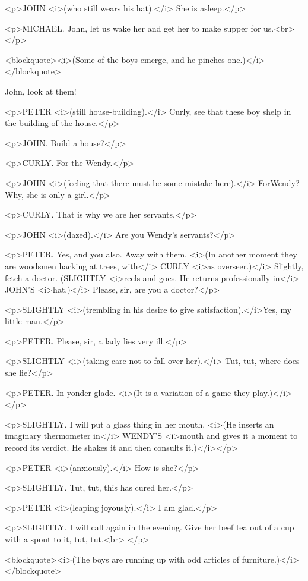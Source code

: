<p>JOHN <i>(who still wears his hat).</i> She is asleep.</p>

<p>MICHAEL. John, let us wake her and get her to make supper for
us.<br>
</p>

<blockquote><i>(Some of the boys emerge, and he pinches
one.)</i></blockquote>

John, look at them! 

<p>PETER <i>(still house-building).</i> Curly, see that these boy
shelp in the building of the house.</p>

<p>JOHN. Build a house?</p>

<p>CURLY. For the Wendy.</p>

<p>JOHN <i>(feeling that there must be some mistake here).</i>
ForWendy? Why, she is only a girl.</p>

<p>CURLY. That is why we are her servants.</p>

<p>JOHN <i>(dazed).</i> Are you Wendy's servants?</p>

<p>PETER. Yes, and you also. Away with them. <i>(In another moment
they are woodsmen hacking at trees, with</i> CURLY <i>as
overseer.)</i> Slightly, fetch a doctor. (SLIGHTLY <i>reels and goes.
He returns professionally in</i> JOHN'S <i>hat.)</i> Please, sir, are
you a doctor?</p>

<p>SLIGHTLY <i>(trembling in his desire to give
satisfaction).</i>Yes, my little man.</p>

<p>PETER. Please, sir, a lady lies very ill.</p>

<p>SLIGHTLY <i>(taking care not to fall over her).</i> Tut, tut,
where does she lie?</p>

<p>PETER. In yonder glade. <i>(It is a variation of a game they
play.)</i></p>

<p>SLIGHTLY. I will put a glass thing in her mouth. <i>(He inserts an
imaginary thermometer in</i> WENDY'S <i>mouth and gives it a moment
to record its verdict. He shakes it and then consults it.)</i></p>

<p>PETER <i>(anxiously).</i> How is she?</p>

<p>SLIGHTLY. Tut, tut, this has cured her.</p>

<p>PETER <i>(leaping joyously).</i> I am glad.</p>

<p>SLIGHTLY. I will call again in the evening. Give her beef tea out
of a cup with a spout to it, tut, tut.<br>
</p>

<blockquote><i>(The boys are running up with odd articles of
furniture.)</i></blockquote>

